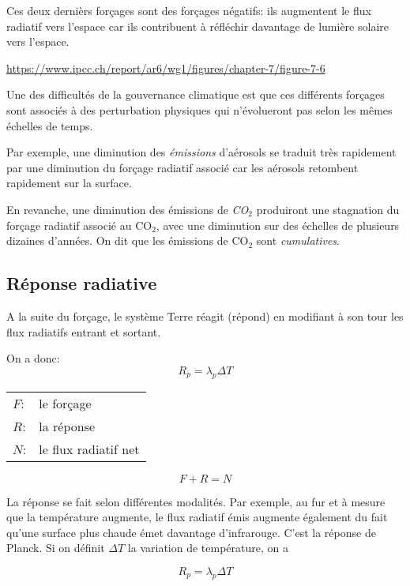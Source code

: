 Ces deux dernièrs forçages sont des forçages négatifs: ils augmentent le flux radiatif vers l'espace car ils contribuent à réfléchir davantage de lumière solaire vers l'espace. 

\url{https://www.ipcc.ch/report/ar6/wg1/figures/chapter-7/figure-7-6}

Une des difficultés de la gouvernance climatique est que ces différents forçages sont associés à des perturbation physiques qui n'évolueront pas selon les mêmes échelles de temps. 

Par exemple, une diminution des \emph{émissions} d'aérosols se traduit très rapidement par une diminution du forçage radiatif associé car les aérosols retombent rapidement sur la surface. 


En revanche, une diminution des émissions de \emph{CO$_2$} produiront une stagnation du forçage radiatif associé au CO$_2$, avec une diminution sur des échelles de plusieurs dizaines d'années. On dit que les émissions de CO$_2$ sont \emph{cumulatives}. 


\subsection{Réponse radiative}

A la suite du forçage, le système Terre réagit (répond)  en modifiant à son tour les flux radiatifs entrant et sortant. 

On a donc: 
\begin{equation}
  R_p = \lambda_p \Delta T
\end{equation}

\medskip

\begin{tabular}{ll}
  $F$: & le forçage \\
  $R$: & la réponse \\
  $N$: & le flux radiatif net 
\end{tabular}

\begin{equation}
  F + R = N
\end{equation}

La réponse se fait selon différentes modalités. Par exemple, au fur et à mesure que la température augmente, le flux radiatif émis augmente également du fait qu'une surface plus chaude émet davantage d'infrarouge. C'est la réponse de Planck. Si on définit $\Delta T$ la variation de température, on a

\begin{equation}
  R_p = \lambda_p \Delta T
\end{equation}

